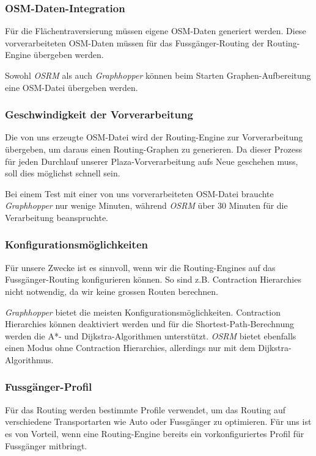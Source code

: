 \subsubsection{OSM-Daten-Integration}
\label{analyse:OSM-Daten-Integration}
Für die Flächentraversierung müssen eigene \ac{OSM}-Daten generiert werden. Diese vorverarbeiteten \ac{OSM}-Daten müssen für das Fussgänger-Routing der Routing-Engine übergeben werden.

Sowohl \emph{OSRM} als auch \emph{Graphhopper} können beim Starten Graphen-Aufbereitung eine \ac{OSM}-Datei übergeben werden.

\subsubsection{Geschwindigkeit der Vorverarbeitung}
\label{analyse:Geschwindigkeit der Vorverarbeitung}
Die von uns erzeugte \ac{OSM}-Datei wird der Routing-Engine zur Vorverarbeitung übergeben, um daraus einen Routing-Graphen zu generieren. Da dieser Prozess für jeden Durchlauf unserer Plaza-Vorverarbeitung aufs Neue geschehen muss, soll dies möglichst schnell sein.

Bei einem Test mit einer von uns vorverarbeiteten OSM-Datei brauchte \emph{Graphhopper} nur wenige Minuten, während \emph{OSRM} über 30 Minuten für die Verarbeitung beanspruchte.

\subsubsection{Konfigurationsmöglichkeiten}
\label{analyse:Konfigurationsmöglichkeiten}
Für unsere Zwecke ist es sinnvoll, wenn wir die Routing-Engines auf das Fussgänger-Routing konfigurieren können. So sind z.B. Contraction Hierarchies nicht notwendig, da wir keine grossen Routen berechnen.

\emph{Graphhopper} bietet die meisten Konfigurationsmöglichkeiten. Contraction Hierarchies können deaktiviert werden und für die Shortest-Path-Berechnung werden die A*- und Dijkstra-Algorithmen \cite{astar} \cite{dijkstra_algorithm} unterstützt. \emph{OSRM} bietet ebenfalls einen Modus ohne Contraction Hierarchies, allerdings nur mit dem Dijkstra-Algorithmus.

\subsubsection{Fussgänger-Profil}
\label{analyse:Fussgänger-Profil}
Für das Routing werden bestimmte Profile verwendet, um das Routing auf verschiedene Transportarten wie Auto oder Fussgänger zu optimieren. Für uns ist es von Vorteil, wenn eine Routing-Engine bereits ein vorkonfiguriertes Profil für Fussgänger mitbringt.

